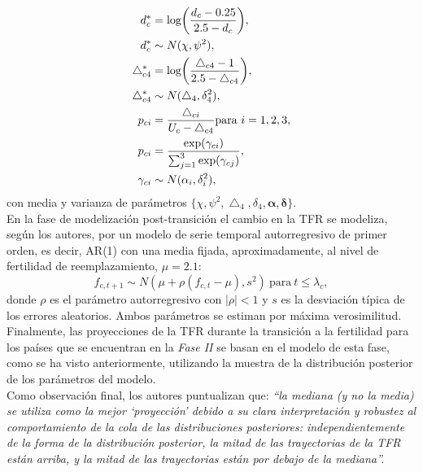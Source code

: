 \begin{align*}
\vspace{-2cm}
d_{c}^{*} & = \text{log}\bigg(\frac{d_{c}-0.25}{2.5-d_{c}}\bigg), \\ 
d_{c}^{*} & \sim N(\chi, \psi^{2}),\\
\bigtriangleup^{*}_{c4} & = \text{log}\bigg(\frac{\bigtriangleup_{c4}-1}{2.5-\bigtriangleup_{c4}}\bigg), \\
\bigtriangleup^{*}_{c4} & \sim N(\bigtriangleup_{4}, \delta^{2}_{4}),\\
p_{ci} & = \frac{\bigtriangleup_{ci}}{U_{c}-\bigtriangleup_{c4}}\text{para}\ i=1,2,3,\\
p_{ci} & = \frac{\text{exp}(\gamma_{ci})}{\sum_{j=1}^{3}\text{exp}(\gamma_{cj})},\\
\gamma_{ci} & \sim N(\alpha_{i}, \delta_{i}^{2}),
\end{align*}
con media y varianza de parámetros $\{\chi, \psi^{2}, \bigtriangleup_{4}, \delta_{4}, \boldsymbol{\alpha, \delta}\}$.\\

En la fase de modelización post-transición el cambio en la TFR se modeliza, según los autores, por un modelo de serie temporal autorregresivo de primer orden, es decir, AR(1) con una media fijada, aproximadamente, al nivel de fertilidad de reemplazamiento, $\mu=2.1$:
\begin{equation}
f_{c,t+1}\sim N(\mu+\rho(f_{c,t}-\mu),s^{2})\ \text{para}\ t \leq \lambda_{c},
\end{equation}
donde $\rho$ es el parámetro autorregresivo con $|\rho|<1$ y $s$ es la desviación típica de los errores aleatorios. Ambos parámetros se estiman por máxima verosimilitud.\\

Finalmente, las proyecciones de la TFR durante la transición a la fertilidad para los países que se encuentran en la \textit{Fase II} se basan en el modelo de esta fase, como se ha visto anteriormente, utilizando la muestra de la distribución posterior de los parámetros del modelo.\\
Como observación final, los autores puntualizan que: \textit{``la mediana (y no la media) se utiliza como la mejor `proyección' debido a su clara interpretación y robustez al comportamiento de la cola de las distribuciones posteriores: independientemente de la forma de la distribución posterior, la mitad de las trayectorias de la TFR están arriba, y la mitad de las trayectorias están por debajo de la mediana''.}


